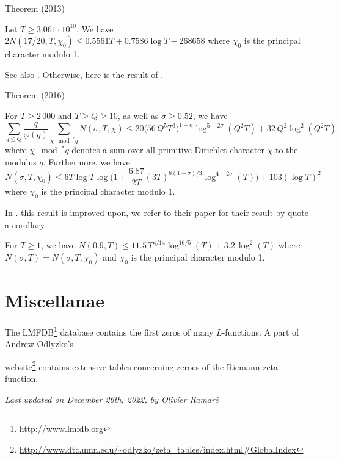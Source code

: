 \par 
\begin{thm}{Theorem (2013)}

  Let $T\ge3.061\cdot10^{10}$. We have
  $
    2N(17/20,T,\chi_0)\le 0.5561T+0.7586\log T-268 658
  $
  where $\chi_0$ is the principal character modulo 1.
\end{thm}


See also
\cite{Kadiri*13}.
Otherwise, here is the result of
\cite{Ramare*13d}.
\par 

\begin{thm}{Theorem (2016)}

  For $T\ge2\,000$ and $T\ge Q\ge10$, as well as $\sigma\ge0.52$, we have 
  $$
    \sum_{q\le Q}\frac{q}{\varphi(q)}
    \sum_{\chi\mod^* q}N(\sigma,T,\chi)
    \le 
    20\bigl(56\,Q^{5}T^3\bigr)^{1-\sigma}\log^{5-2\sigma}(Q^2T)
    +32\,Q^2\log^2(Q^2T)
  $$
  where $\chi\mod^* q$ denotes a sum over all primitive Dirichlet character
  $\chi$ to the modulus $q$. Furthermore, we have
  $$
    N(\sigma,T,\chi_0)\le 6T\log T
    \log\biggl(1+\frac{6.87}{2T}(3T)^{8(1-\sigma)/{3}}\log^{4-2\sigma}(T)\biggr)
    +103(\log T)^2
  $$
  where $\chi_0$ is the principal character modulo 1.
\end{thm}

In
\cite{Kadiri-Lumley-Ng*18}.
this result is improved upon, we refer to their paper for their result
by quote a corollary.


  For $T\ge1$, we have 
  $
    N(0.9,T)
    \le 
    11.5\, T^{4/14}\log^{16/5}(T)
    +3.2\,\log^2(T)
  $
  where $N(\sigma,T)=N(\sigma,T,\chi_0)$ and $\chi_0$ is the principal character modulo 1.


\section{Miscellanae}



The LMFDB\footnote{\url{http://www.lmfdb.org}} database contains the first zeros
of many $L$-functions. A part of Andrew Odlyzko's 

website\footnote{\url{http://www.dtc.umn.edu/~odlyzko/zeta_tables/index.html#GlobalIndex}}
contains extensive tables concerning zeroes of the Riemann zeta function.




 
 







  
\begin{flushright}\small\sl{}   Last updated on December 26th, 2022, by Olivier Ramar\'e
 \end{flushright}














